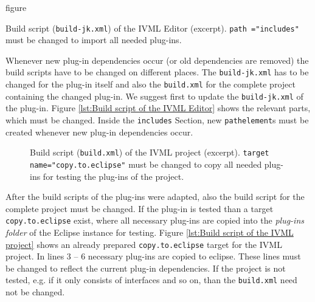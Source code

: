 \begin{nofloat}{figure}
	\centering
	
	\caption[Build script of the IVML Editor]{Build script (\texttt{build-jk.xml}) of the IVML Editor (excerpt). \texttt{path ="includes"} must be changed to import all needed plug-ins.}
	\label{lst:Build script of the IVML Editor}
\end{nofloat}
Whenever new plug-in dependencies occur (or old dependencies are removed) the build scripts have to be changed on different places. The \texttt{build-jk.xml} has to be changed for the plug-in itself and also the \texttt{build.xml} for the complete project containing the changed plug-in. We suggest first to update the \texttt{build-jk.xml} of the plug-in. Figure \vref{lst:Build script of the IVML Editor} shows the relevant parts, which must be changed. Inside the \texttt{includes} Section, new \texttt{pathelement}s must be created whenever new plug-in dependencies occur.

\begin{figure}[ht]
	\centering
	
	\caption[Build script of the IVML project]{Build script (\texttt{build.xml}) of the IVML project (excerpt). \texttt{target name="copy.to.eclipse"} must be changed to copy all needed plug-ins for testing the plug-ins of the project.}
	\label{lst:Build script of the IVML project}
\end{figure}

\label{editing includes}
After the build scripts of the plug-ins were adapted, also the build script for the complete project must be changed. If the plug-in is tested than a target \texttt{copy.to.eclipse} exist, where all necessary plug-ins are copied into the \textit{plug-ins folder} of the Eclipse instance for testing. Figure \vref{lst:Build script of the IVML project} shows an already prepared \texttt{copy.to.eclipse} target for the IVML project. In lines 3 -- 6 necessary plug-ins are copied to eclipse. These lines must be changed to reflect the current plug-in dependencies. If the project is not tested, e.g. if it only consists of interfaces and so on, than the \texttt{build.xml} need not be changed.

